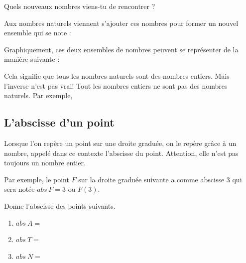 \documentclass[../../syllabus_1.tex]{subfiles}
\begin{document}
Quels nouveaux nombres viens-tu de rencontrer ? 

Aux nombres naturels viennent s'ajouter ces nombres pour former un nouvel ensemble qui se note : 
\vspace{0.5cm}

Graphiquement, ces deux ensembles de nombres peuvent se représenter de la manière suivante : 
\vspace{5cm}

Cela signifie que tous les nombres naturels sont des nombres entiers. Mais l'inverse n'est pas vrai! Tout les nombres entiers ne sont pas des nombres naturels. Par exemple,

\newpage
\subsection{L'abscisse d'un point}

Lorsque l'on repère un point sur une droite graduée, on le repère grâce à un nombre, appelé dans ce contexte l'abscisse du point. Attention, elle n'est pas toujours un nombre entier.

Par exemple, le point $F$ sur la droite graduée suivante a comme abscisse $3$ qui sera notée $abs~F = 3$ ou $F(3)$.

\begin{center}
\end{center}

Donne l'abscisse des points suivants.

\begin{enumerate}[cols=3, label=]
    \item $abs~A=$
    \item $abs~T=$
    \item $abs~N = $
\end{enumerate}
\end{document}

